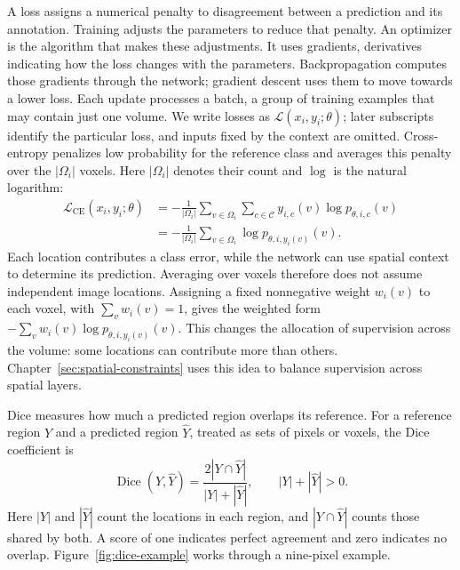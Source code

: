 \documentclass[12pt,a4paper]{article}
\begin{document}
A loss assigns a numerical penalty to disagreement between a prediction
and its annotation. Training adjusts the parameters to reduce that
penalty. An optimizer is the algorithm that makes these adjustments.
It uses gradients, derivatives indicating how the loss changes with the
parameters. Backpropagation computes those gradients through the network;
gradient descent uses them to move towards a lower loss. Each update
processes a batch, a group of training examples that may contain just
one volume. We write losses as $\mathcal L(x_i,y_i;\theta)$; later subscripts
identify the particular loss, and inputs fixed by the context are omitted.
Cross-entropy penalizes low probability for the reference class and
averages this penalty over the $|\Omega_i|$ voxels. Here $|\Omega_i|$
denotes their count and $\log$ is the natural logarithm:
\begin{equation}
\begin{aligned}
\mathcal{L}_{\mathrm{CE}}(x_i,y_i;\theta)
&=-\frac{1}{|\Omega_i|}\sum_{v\in\Omega_i}
  \sum_{c\in\mathcal{C}}y_{i,c}(v)\log p_{\theta,i,c}(v)\\
&=-\frac{1}{|\Omega_i|}\sum_{v\in\Omega_i}
  \log p_{\theta,i,y_i(v)}(v).
\end{aligned}
\label{eq:cross-entropy}
\end{equation}
Each location contributes a class error, while the network can use spatial
context to determine its prediction. Averaging over voxels therefore
does not assume independent image locations. Assigning a fixed nonnegative
weight $w_i(v)$ to each voxel, with $\sum_v w_i(v)=1$, gives the weighted form
$-\sum_v w_i(v)\log p_{\theta,i,y_i(v)}(v)$. This changes the allocation
of supervision across the volume: some locations can contribute more
than others. Chapter~\ref{sec:spatial-constraints} uses this idea to
balance supervision across spatial layers.

Dice measures how much a predicted region overlaps its reference.
For a reference region $Y$ and a predicted region $\widehat Y$, treated
as sets of pixels or voxels, the Dice coefficient is
\begin{equation}
\operatorname{Dice}(Y,\widehat Y)
=\frac{2|Y\cap\widehat Y|}{|Y|+|\widehat Y|},
\qquad |Y|+|\widehat Y|>0.
\label{eq:dice-set-definition}
\end{equation}
Here $|Y|$ and $|\widehat Y|$ count the locations in each region, and
$|Y\cap\widehat Y|$ counts those shared by both. A score of one
indicates perfect agreement and zero indicates no overlap.
Figure~\ref{fig:dice-example} works through a nine-pixel example.
\end{document}
